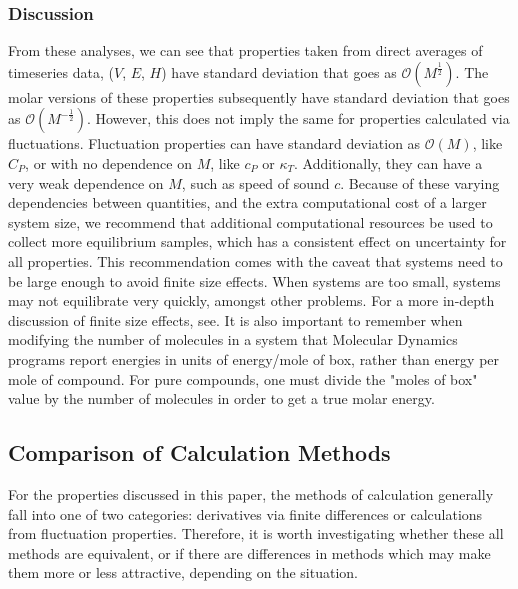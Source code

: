 \documentclass[9pt,bestpractices]{livecoms}
\begin{document}
\subsubsection{Discussion}
From these analyses, we can see that properties taken from direct averages of timeseries data, ($V$, $E$, $H$) have standard deviation that goes as $\mathcal{O}(M^{\frac{1}{2}})$.  The molar versions of these properties subsequently have standard deviation that goes as $\mathcal{O}(M^{-\frac{1}{2}})$.  However, this does not imply the same for properties calculated via fluctuations.  Fluctuation properties can have standard deviation as $\mathcal{O}(M)$, like $C_P$, or with no dependence on $M$, like $c_P$ or $\kappa_T$.  Additionally, they can have a very weak dependence on $M$, such as speed of sound $c$.  Because of these varying dependencies between quantities, and the extra computational cost of a larger system size, we recommend that additional computational resources be used to collect more equilibrium samples, which has a consistent effect on uncertainty for all properties.  This recommendation comes with the caveat that systems need to be large enough to avoid finite size effects.  When systems are too small, systems may not equilibrate very quickly, amongst other problems.  For a more in-depth discussion of finite size effects, see. %
It is also important to remember when modifying the number of molecules in a system that Molecular Dynamics programs report energies in units of energy/mole of box, rather than energy per mole of compound.  For pure compounds, one must divide the "moles of box" value by the number of molecules in order to get a true molar energy.



\subsection{Comparison of Calculation Methods}

For the properties discussed in this paper, the methods of calculation generally fall into one of two categories: derivatives via finite differences or calculations from fluctuation properties. Therefore, it is worth investigating whether these all methods are equivalent, or if there are differences in methods which may make them more or less attractive, depending on the situation.  
\end{document}
